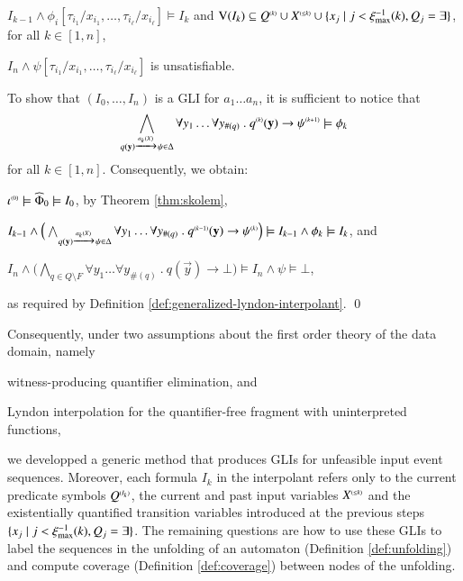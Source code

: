 {\begin{compactitem}
    \item $I_{k-1} \wedge \phi_i[\tau_{i_1}/x_{i_1}, \ldots,
      \tau_{i_\ell}/x_{i_\ell}] \models I_k$ and $\mathrm{V}({I_k}) \subseteq
      {Q}^{\scriptscriptstyle{({k})}} \cup {X}^{\scriptscriptstyle{({\leq k})}} \cup \{ x_j \mid j <
       \xi_{\max}^{-1}(k), Q_j = \exists \}$, for all $k \in [1,n]$,
    \item $I_n \wedge \psi[\tau_{i_1}/x_{i_1}, \ldots,
      \tau_{i_\ell}/x_{i_\ell}]$ is unsatisfiable.
  \end{compactitem}
  To show that $(I_0,\ldots,I_n)$ is a GLI for $a_1\ldots a_n$, it is
  sufficient to notice that \[\bigwedge_{q(\mathbf y) \xrightarrow{{\scriptscriptstyle a_k(X)}}_{{\scriptstyle }}
    \psi \in \Delta} \forall y_1 \ldots \forall y_{\#(q)} ~.~
  {q}^{\scriptscriptstyle{({k})}}(\mathbf y) \rightarrow {\psi}^{\scriptscriptstyle{({k+1})}} \models \phi_k\]
  for all $k \in [1,n]$. Consequently, we obtain: \begin{compactitem}
    \item ${\iota}^{\scriptscriptstyle{({0})}} \models \widehat{\Phi}_0 \models I_0$, by
      Theorem \ref{thm:skolem},
    \item $I_{k-1} \wedge \Big(\bigwedge_{q(\mathbf y) \xrightarrow{{\scriptscriptstyle a_k(X)}}_{{\scriptstyle }}
      \psi \in \Delta} \forall y_1 \ldots \forall y_{\#(q)} ~.~
      {q}^{\scriptscriptstyle{({k-1})}}(\mathbf y) \rightarrow {\psi}^{\scriptscriptstyle{({k})}}\Big) \models
      I_{k-1} \wedge \phi_k \models I_k$, and 
    \item $I_n \wedge \Big(\bigwedge_{q \in Q \setminus F} \forall y_1
      \ldots \forall y_{\#(q)} ~.~ q(\vec{y}) \rightarrow \bot\Big)
      \models I_n \wedge \psi \models \bot$,     
  \end{compactitem}
  as required by Definition
  \ref{def:generalized-lyndon-interpolant}. \qed}

Consequently, under two assumptions about the first order theory of
the data domain, namely\ \begin{inparaenum}[(i)]
\item witness-producing quantifier elimination, and
\item Lyndon interpolation for the quantifier-free fragment with
  uninterpreted functions,
\end{inparaenum}
we developped a generic method that produces GLIs for unfeasible input
event sequences. Moreover, each formula $I_k$ in the interpolant
refers only to the current predicate symbols ${Q}^{\scriptscriptstyle{({I_k})}}$, the
current and past input variables ${X}^{\scriptscriptstyle{({\leq k})}}$ and the
existentially quantified transition variables introduced at the
previous steps $\{ x_j \mid j < \xi_{\max}^{-1}(k), Q_j =
  \exists \}$. The remaining questions are how to use these GLIs to
label the sequences in the unfolding of an automaton (Definition
\ref{def:unfolding}) and compute coverage (Definition
\ref{def:coverage}) between nodes of the unfolding.

